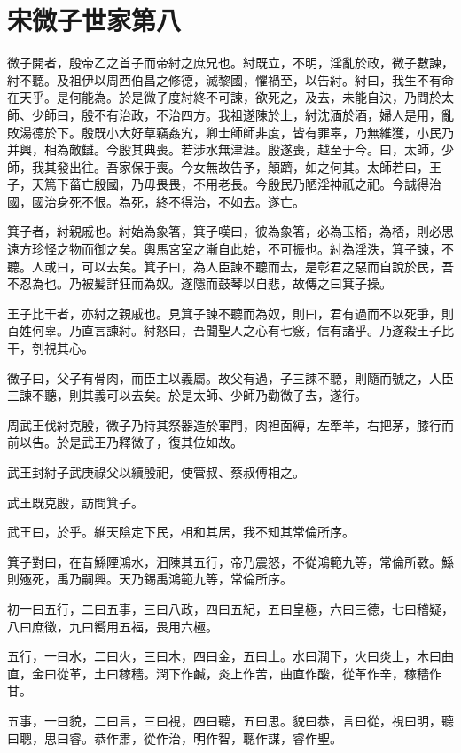 \chapter{宋微子世家第八}

微子開者，殷帝乙之首子而帝紂之庶兄也。紂既立，不明，淫亂於政，微子數諫，紂不聽。及祖伊以周西伯昌之修德，滅黎國，懼禍至，以告紂。紂曰，我生不有命在天乎。是何能為。於是微子度紂終不可諫，欲死之，及去，未能自決，乃問於太師、少師曰，殷不有治政，不治四方。我祖遂陳於上，紂沈湎於酒，婦人是用，亂敗湯德於下。殷既小大好草竊姦宄，卿士師師非度，皆有罪辜，乃無維獲，小民乃并興，相為敵讎。今殷其典喪。若涉水無津涯。殷遂喪，越至于今。曰，太師，少師，我其發出往。吾家保于喪。今女無故告予，顛躋，如之何其。太師若曰，王子，天篤下菑亡殷國，乃毋畏畏，不用老長。今殷民乃陋淫神祇之祀。今誠得治國，國治身死不恨。為死，終不得治，不如去。遂亡。

箕子者，紂親戚也。紂始為象箸，箕子嘆曰，彼為象箸，必為玉桮，為桮，則必思遠方珍怪之物而御之矣。輿馬宮室之漸自此始，不可振也。紂為淫泆，箕子諫，不聽。人或曰，可以去矣。箕子曰，為人臣諫不聽而去，是彰君之惡而自說於民，吾不忍為也。乃被髪詳狂而為奴。遂隱而鼓琴以自悲，故傳之曰箕子操。

王子比干者，亦紂之親戚也。見箕子諫不聽而為奴，則曰，君有過而不以死爭，則百姓何辜。乃直言諫紂。紂怒曰，吾聞聖人之心有七竅，信有諸乎。乃遂殺王子比干，刳視其心。

微子曰，父子有骨肉，而臣主以義屬。故父有過，子三諫不聽，則隨而號之，人臣三諫不聽，則其義可以去矣。於是太師、少師乃勸微子去，遂行。

周武王伐紂克殷，微子乃持其祭器造於軍門，肉袒面縛，左牽羊，右把茅，膝行而前以告。於是武王乃釋微子，復其位如故。

武王封紂子武庚祿父以續殷祀，使管叔、蔡叔傅相之。

武王既克殷，訪問箕子。

武王曰，於乎。維天陰定下民，相和其居，我不知其常倫所序。

箕子對曰，在昔鯀陻鴻水，汨陳其五行，帝乃震怒，不從鴻範九等，常倫所斁。鯀則殛死，禹乃嗣興。天乃錫禹鴻範九等，常倫所序。

初一曰五行，二曰五事，三曰八政，四曰五紀，五曰皇極，六曰三德，七曰稽疑，八曰庶徵，九曰嚮用五福，畏用六極。

五行，一曰水，二曰火，三曰木，四曰金，五曰土。水曰潤下，火曰炎上，木曰曲直，金曰從革，土曰稼穡。潤下作鹹，炎上作苦，曲直作酸，從革作辛，稼穡作甘。

五事，一曰貌，二曰言，三曰視，四曰聽，五曰思。貌曰恭，言曰從，視曰明，聽曰聰，思曰睿。恭作肅，從作治，明作智，聰作謀，睿作聖。

